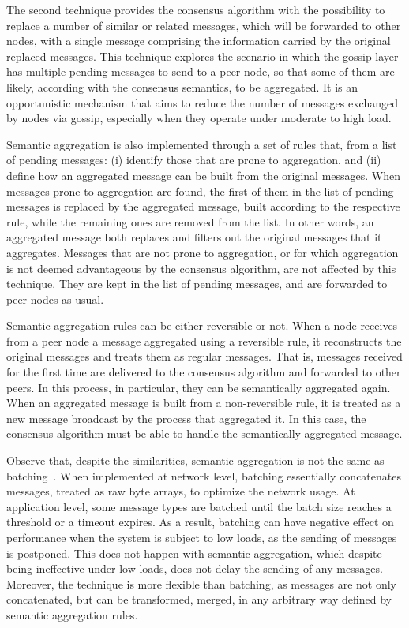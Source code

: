The second technique provides the consensus algorithm with the possibility to
replace a number of similar or related messages, which will be forwarded to other nodes,
with a single message comprising the information carried by the original
replaced messages.
This technique explores the scenario in which the gossip layer has multiple
pending messages to send to a peer node, so that some of them are likely, according
with the consensus semantics, to be aggregated.
It is an opportunistic mechanism that aims to reduce the number of messages
exchanged by nodes via gossip, especially when they operate under moderate
to high load.

Semantic aggregation is also implemented through a set of rules that, from a
list of pending messages: (i) identify those that are prone to aggregation, and
(ii) define how an aggregated message can be built from the original messages.
When messages prone to aggregation are found, the first of them in the list of
pending messages is replaced by the aggregated message, built according to
the respective rule, while the remaining ones are removed from the list.
In other words, an aggregated message both replaces and filters out the
original messages that it aggregates.
Messages that are not prone to aggregation, or for which aggregation is not
deemed advantageous by the consensus algorithm, are not affected by this
technique.
They are kept in the list of pending messages, and are forwarded to peer nodes as
usual.

Semantic aggregation rules can be either reversible or not.
When a node receives from a peer node a message aggregated using a reversible
rule, it reconstructs the original messages and treats them as regular messages.
That is, messages received for the first time are delivered to the
consensus algorithm and forwarded to other peers.
In this process, in
particular, they can be semantically aggregated again.
When an aggregated message is built from a non-reversible rule, it is treated
as a new message broadcast by the process that aggregated it.
In this case, the consensus algorithm must be able to handle the
semantically aggregated message.

Observe that, despite the similarities, semantic aggregation is not the same as
batching~\cite{FR95}.
When implemented at network level, batching essentially concatenates messages,
treated as raw byte arrays, to optimize the network usage.
At application level, some message types are batched until the batch size
reaches a threshold or a timeout expires.
As a result, batching can have negative effect on performance when the system
is subject to low loads, as the sending of messages is postponed.
This does not happen with semantic aggregation, which despite being ineffective
under low loads, does not delay the sending of any messages.
Moreover, the technique is more flexible than batching, as messages are not
only concatenated, but can be transformed, merged, in any arbitrary way defined
by semantic aggregation rules.

